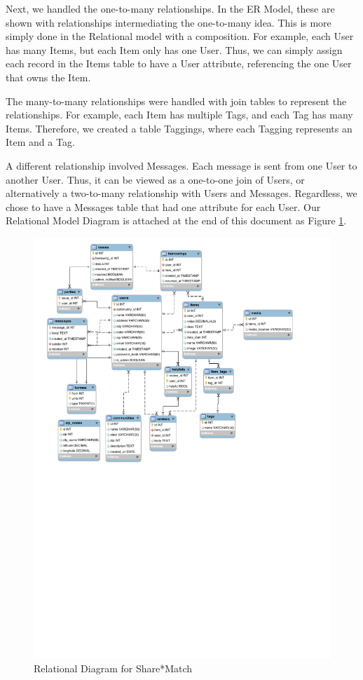 \documentclass{acm_proc_article-sp}
\begin{document}
Next, we handled the one-to-many relationships. In the ER Model, these are shown with relationships intermediating the one-to-many idea. This is more simply done in the Relational model with a composition. For example, each User has many Items, but each Item only has one User. Thus, we can simply assign each record in the Items table to have a User attribute, referencing the one User that owns the Item.

The many-to-many relationships were handled with join tables to represent the relationships. For example, each Item has multiple Tags, and each Tag has many Items. Therefore, we created a table Taggings, where each Tagging represents an Item and a Tag.

A different relationship involved Messages. Each message is sent from one User to another User. Thus, it can be viewed as a one-to-one join of Users, or alternatively a two-to-many relationship with Users and Messages. Regardless, we chose to have a Messages table that had one attribute for each User.
Our Relational Model Diagram is attached at the end of this document as Figure \ref{fig:RelationalDiagram}.
\begin{figure}[p]
    \includegraphics[width=\textwidth]{EECS341Relational.pdf}
    \caption{Relational Diagram for Share*Match}
    \label{fig:RelationalDiagram}
\end{figure}
\end{document}
